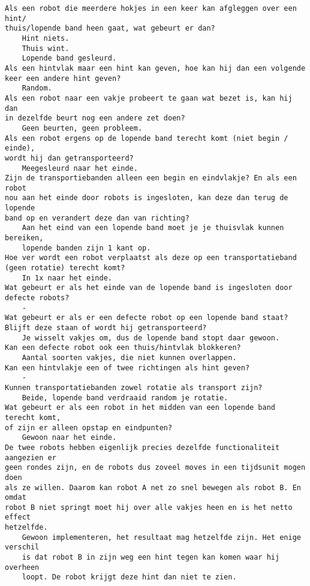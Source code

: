 \lstset{
	tabsize=5,
	basicstyle=\small,
}

\begin{lstlisting}
Als een robot die meerdere hokjes in een keer kan afgleggen over een hint/
thuis/lopende band heen gaat, wat gebeurt er dan?
	Hint niets.
	Thuis wint.
	Lopende band gesleurd.
Als een hintvlak maar een hint kan geven, hoe kan hij dan een volgende 
keer een andere hint geven?
	Random.
Als een robot naar een vakje probeert te gaan wat bezet is, kan hij dan 
in dezelfde beurt nog een andere zet doen?
	Geen beurten, geen probleem.
Als een robot ergens op de lopende band terecht komt (niet begin / einde), 
wordt hij dan getransporteerd?
	Meegesleurd naar het einde.
Zijn de transportiebanden alleen een begin en eindvlakje? En als een robot 
nou aan het einde door robots is ingesloten, kan deze dan terug de lopende 
band op en verandert deze dan van richting?
	Aan het eind van een lopende band moet je je thuisvlak kunnen bereiken, 
	lopende banden zijn 1 kant op.
Hoe ver wordt een robot verplaatst als deze op een transportatieband 
(geen rotatie) terecht komt? 
	In 1x naar het einde.
Wat gebeurt er als het einde van de lopende band is ingesloten door 
defecte robots?
	-
Wat gebeurt er als er een defecte robot op een lopende band staat? 
Blijft deze staan of wordt hij getransporteerd?
	Je wisselt vakjes om, dus de lopende band stopt daar gewoon.
Kan een defecte robot ook een thuis/hintvlak blokkeren?
	Aantal soorten vakjes, die niet kunnen overlappen.
Kan een hintvlakje een of twee richtingen als hint geven?
	-
Kunnen transportatiebanden zowel rotatie als transport zijn?
	Beide, lopende band verdraaid random je rotatie.
Wat gebeurt er als een robot in het midden van een lopende band terecht komt, 
of zijn er alleen opstap en eindpunten?
	Gewoon naar het einde.
De twee robots hebben eigenlijk precies dezelfde functionaliteit aangezien er 
geen rondes zijn, en de robots dus zoveel moves in een tijdsunit mogen doen 
als ze willen. Daarom kan robot A net zo snel bewegen als robot B. En omdat 
robot B niet springt moet hij over alle vakjes heen en is het netto effect 
hetzelfde.
	Gewoon implementeren, het resultaat mag hetzelfde zijn. Het enige verschil 
	is dat robot B in zijn weg een hint tegen kan komen waar hij overheen 
	loopt. De robot krijgt deze hint dan niet te zien.

\end{lstlisting}
